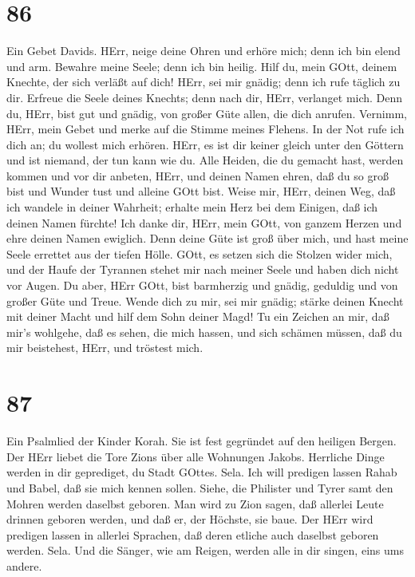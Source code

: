 \hypertarget{section-85}{%
\section{86}\label{section-85}}

 Ein Gebet Davids. HErr, neige deine Ohren und erhöre mich;
denn ich bin elend und arm.  Bewahre meine Seele; denn ich
bin heilig. Hilf du, mein GOtt, deinem Knechte, der sich verläßt auf
dich!  HErr, sei mir gnädig; denn ich rufe täglich zu dir.
 Erfreue die Seele deines Knechts; denn nach dir, HErr,
verlanget mich.  Denn du, HErr, bist gut und gnädig, von
großer Güte allen, die dich anrufen.  Vernimm, HErr, mein
Gebet und merke auf die Stimme meines Flehens.  In der Not
rufe ich dich an; du wollest mich erhören.  HErr, es ist dir
keiner gleich unter den Göttern und ist niemand, der tun kann wie du.
 Alle Heiden, die du gemacht hast, werden kommen und vor dir
anbeten, HErr, und deinen Namen ehren,  daß du so groß bist
und Wunder tust und alleine GOtt bist.  Weise mir, HErr,
deinen Weg, daß ich wandele in deiner Wahrheit; erhalte mein Herz bei
dem Einigen, daß ich deinen Namen fürchte!  Ich danke dir,
HErr, mein GOtt, von ganzem Herzen und ehre deinen Namen ewiglich.
 Denn deine Güte ist groß über mich, und hast meine Seele
errettet aus der tiefen Hölle.  GOtt, es setzen sich die
Stolzen wider mich, und der Haufe der Tyrannen stehet mir nach meiner
Seele und haben dich nicht vor Augen.  Du aber, HErr GOtt,
bist barmherzig und gnädig, geduldig und von großer Güte und Treue.
 Wende dich zu mir, sei mir gnädig; stärke deinen Knecht
mit deiner Macht und hilf dem Sohn deiner Magd!  Tu ein
Zeichen an mir, daß mir's wohlgehe, daß es sehen, die mich hassen, und
sich schämen müssen, daß du mir beistehest, HErr, und tröstest mich.

\hypertarget{section-86}{%
\section{87}\label{section-86}}

 Ein Psalmlied der Kinder Korah. Sie ist fest gegründet auf
den heiligen Bergen.  Der HErr liebet die Tore Zions über
alle Wohnungen Jakobs.  Herrliche Dinge werden in dir
geprediget, du Stadt GOttes. Sela.  Ich will predigen lassen
Rahab und Babel, daß sie mich kennen sollen. Siehe, die Philister und
Tyrer samt den Mohren werden daselbst geboren.  Man wird zu
Zion sagen, daß allerlei Leute drinnen geboren werden, und daß er, der
Höchste, sie baue.  Der HErr wird predigen lassen in
allerlei Sprachen, daß deren etliche auch daselbst geboren werden. Sela.
 Und die Sänger, wie am Reigen, werden alle in dir singen,
eins ums andere.

